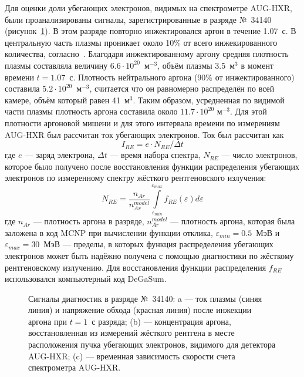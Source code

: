 Для оценки доли убегающих электронов, видимых на спектрометре AUG-HXR, были проанализированы сигналы, зарегистрированные в разряде №~34140 (рисунок~\ref{fig:asdexPlasmaParamsPulse34140}). В этом разряде повторно инжектировался аргон в течение 1.07~с. В центральную часть плазмы проникает около 10\% от всего инжекированного количества, согласно~\cite{Pautasso2020}. Благодаря инжектированному аргону средняя плотность плазмы составляла величину $6.6\cdot 10^{20}$~м${}^{-3}$, объём плазмы 3.5~м${}^3$ в момент времени $t = 1.07$~с. Плотность нейтрального аргона (90\% от инжектированного) составила $5.2\cdot 10^{20}$~м${}^{-3}$, считается что он равномерно распределён по всей камере, объём который равен 41~м${}^3$. Таким образом, усредненная по видимой части плазмы плотность аргона составила около $11.7 \cdot 10^{20}$ м${}^{-3}$. Для этой плотности аргоновой мишени и для этого интервала времени по измерениям AUG-HXR был рассчитан ток убегающих электронов. Ток был рассчитан как 
\begin{equation*}
  I_{RE} = e \cdot N_{RE} / \Delta t
\end{equation*}
где $e$ --- заряд электрона, $\Delta t$ --- время набора спектра, $N_{RE}$ --- число электронов, которое было получено после восстановления функции распределения убегающих электронов по измеренному спектру жёсткого рентгеновского излучения:
\begin{equation*}
  N_{RE} = \frac{ n_{Ar} }{ n_{Ar}^{model} } \int \limits_{\varepsilon_{min}}^{\varepsilon_{max}} f_{RE}( \varepsilon ) d\varepsilon
\end{equation*}
где $n_{Ar}$ --- плотность аргона в разряде, $n_{Ar}^{model}$ --- плотность аргона, которая была заложена в код MCNP при вычислении функции отклика, $ \varepsilon_{min} = 0.5$~МэВ и $ \varepsilon_{max} = 30$~МэВ --- пределы, в которых функция распределения убегающих электронов может быть надёжно получена с помощью диагностики по жёсткому рентгеновскому излучению. Для восстановления функции распределения $f_{RE}$ использовался компьютерный код DeGaSum.~\cite{Shevelev2021}
 
\begin{figure}[ht!]
  \caption{ Сигналы диагностик в разряде №~34140: a --- ток плазмы (синяя линия) и напряжение обхода (красная линия) после инжекции аргона при $t = 1$~с разряда; (b) --- концентрация аргона, восстановленная из измерений жёсткого рентгена в месте расположения пучка убегающих электронов, видимого для детектора AUG-HXR; (c) --- временная зависимость скорости счета спектрометра AUG-HXR.~\cite{Shevelev2021} }
  \label{fig:asdexPlasmaParamsPulse34140}
\end{figure}


